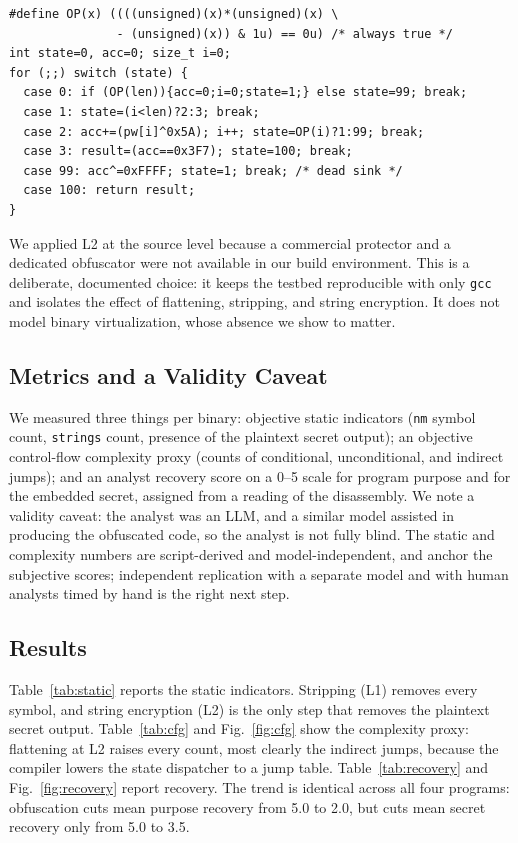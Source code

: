 \documentclass[conference]{IEEEtran}
\begin{document}
\begin{lstlisting}[style=ccode,caption={Control-flow flattening at L2 (P1, abridged).},label={lst:flatten}]
#define OP(x) ((((unsigned)(x)*(unsigned)(x) \
               - (unsigned)(x)) & 1u) == 0u) /* always true */
int state=0, acc=0; size_t i=0;
for (;;) switch (state) {
  case 0: if (OP(len)){acc=0;i=0;state=1;} else state=99; break;
  case 1: state=(i<len)?2:3; break;
  case 2: acc+=(pw[i]^0x5A); i++; state=OP(i)?1:99; break;
  case 3: result=(acc==0x3F7); state=100; break;
  case 99: acc^=0xFFFF; state=1; break; /* dead sink */
  case 100: return result;
}
\end{lstlisting}

We applied L2 at the source level because a commercial protector and a dedicated
obfuscator were not available in our build environment. This is a deliberate,
documented choice: it keeps the testbed reproducible with only \texttt{gcc} and
isolates the effect of flattening, stripping, and string encryption. It does not
model binary virtualization, whose absence we show to matter.

\subsection{Metrics and a Validity Caveat}
We measured three things per binary: objective static indicators (\texttt{nm} symbol
count, \texttt{strings} count, presence of the plaintext secret output); an
objective control-flow complexity proxy (counts of conditional, unconditional, and
indirect jumps); and an analyst recovery score on a 0--5 scale for program purpose
and for the embedded secret, assigned from a reading of the disassembly. We note a
validity caveat: the analyst was an LLM, and a similar model assisted in producing
the obfuscated code, so the analyst is not fully blind. The static and complexity
numbers are script-derived and model-independent, and anchor the subjective scores;
independent replication with a separate model and with human analysts timed by hand
is the right next step.

\subsection{Results}
Table~\ref{tab:static} reports the static indicators. Stripping (L1) removes every
symbol, and string encryption (L2) is the only step that removes the plaintext
secret output. Table~\ref{tab:cfg} and Fig.~\ref{fig:cfg} show the complexity proxy:
flattening at L2 raises every count, most clearly the indirect jumps, because the
compiler lowers the state dispatcher to a jump table. Table~\ref{tab:recovery} and
Fig.~\ref{fig:recovery} report recovery. The trend is identical across all four
programs: obfuscation cuts mean purpose recovery from 5.0 to 2.0, but cuts mean
secret recovery only from 5.0 to 3.5.
\end{document}
